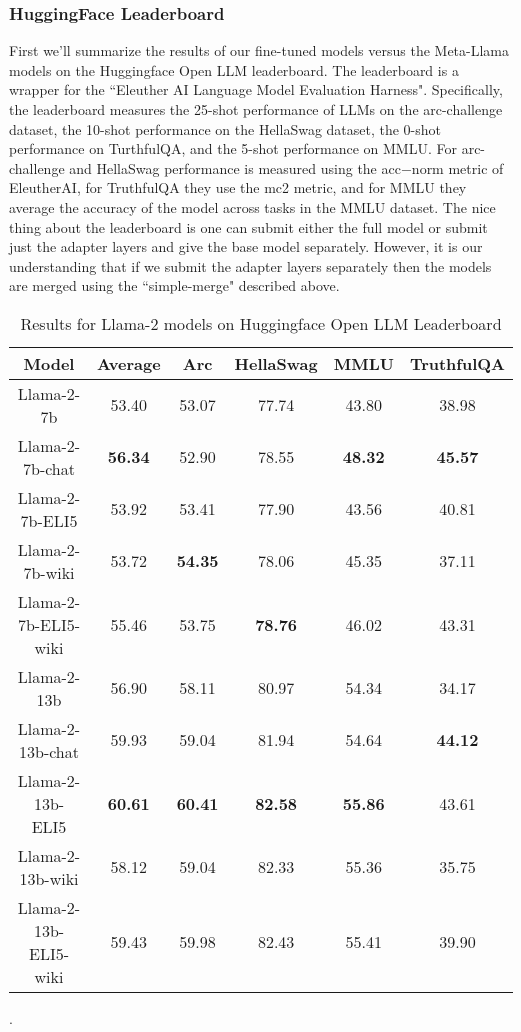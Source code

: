 \documentclass[11pt, oneside]{article}   	%
\begin{document}
\subsubsection{HuggingFace Leaderboard}
First we'll summarize the results of our fine-tuned models versus the Meta-Llama models on the Huggingface Open LLM leaderboard.
The leaderboard is a wrapper for the ``Eleuther AI Language Model Evaluation Harness". 
Specifically, the leaderboard measures the 25-shot performance of LLMs on the arc-challenge dataset, the 10-shot performance on the HellaSwag dataset, the 0-shot performance on TurthfulQA, and the 5-shot performance on MMLU. 
For arc-challenge and HellaSwag performance is measured using the acc$-$norm metric of EleutherAI, for TruthfulQA they use the mc2 metric, and for MMLU they average the accuracy of the model across tasks in the MMLU dataset.
The nice thing about the leaderboard is one can submit either the full model or submit just the adapter layers and give the base model separately.
However, it is our understanding that if we submit the adapter layers separately then the models are merged using the ``simple-merge" described above.
\begin{table}
\begin{center}
\begin{tabular}{|c|c|c|c|c|c|}
\hline
Model &          Average & Arc & HellaSwag & MMLU & TruthfulQA \\
\hline
Llama-2-7b&                  53.40               &   53.07            & 77.74              &  43.80                &  38.98 \\
Llama-2-7b-chat  &          \textbf{56.34} &  52.90              & 78.55             &  \textbf{48.32}    &  \textbf{45.57} \\
Llama-2-7b-ELI5  &           53.92             &  53.41              & 77.90             &  43.56                 & 40.81\\
Llama-2-7b-wiki &           53.72              &  \textbf{54.35} & 78.06             &  45.35                 & 37.11\\
Llama-2-7b-ELI5-wiki&    55.46               &  53.75              & \textbf{78.76}&  46.02                   & 43.31\\
\hhline{|=|=|=|=|=|=|}
Llama-2-13b &               56.90              &   58.11             & 80.97            &  54.34            & 34.17\\
Llama-2-13b-chat&        59.93              & 59.04               & 81.94            &  54.64            & \textbf{44.12}\\
Llama-2-13b-ELI5&          \textbf{60.61} &  \textbf{60.41}  & \textbf{82.58}&  \textbf{55.86}& 43.61\\
Llama-2-13b-wiki&	        58.12             &  59.04               & 82.33            &  55.36            & 35.75\\
Llama-2-13b-ELI5-wiki&   59.43             &  59.98               & 82.43            &  55.41            & 39.90 \\
\hline
\end{tabular}
\end{center}
\caption{Results for Llama-2 models on Huggingface Open LLM Leaderboard}.
\label{table:hfleaderboard}
\end{table}
\end{document}

